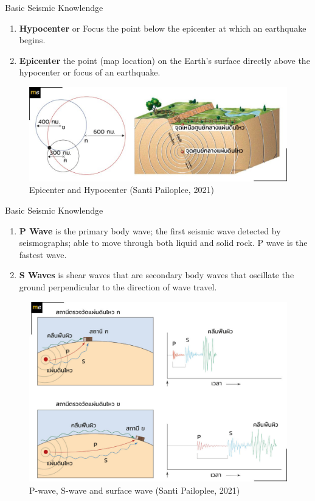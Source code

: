 \documentclass{beamer}
\newcounter{saveenumi}
\newcommand{\seti}{\setcounter{saveenumi}{\value{enumi}}}
\newcommand{\conti}{\setcounter{enumi}{\value{saveenumi}}}
\begin{document}
	\begin{frame}[t]{Basic Seismic Knowlendge}
		\begin{enumerate}
			\conti
			\item \textbf{Hypocenter} or Focus the point below the epicenter at which an earthquake
			begins.
			\item \textbf{Epicenter} the point (map location) on the Earth’s surface directly above 
			the hypocenter or focus of an earthquake.
			\seti
		\end{enumerate}
		\begin{figure}
			\centering
			\includegraphics[scale=0.8]{velocity.jpg}
			\caption{Epicenter and Hypocenter (Santi Pailoplee, 2021)}
		\end{figure}
	\end{frame}

	\begin{frame}[t]{Basic Seismic Knowlendge}
		\begin{enumerate}
			\conti
			\item \textbf{P Wave} is the primary body wave; the first seismic wave detected by 
			seismographs; able to move through both liquid and solid rock. P wave is the fastest wave.
			
			\item \textbf{S Waves} is shear waves that are secondary body waves that oscillate the ground perpendicular to the direction of wave travel. 
			\seti
		\end{enumerate}
		\begin{figure}
			\centering
			\includegraphics[scale=0.6]{station.jpg}
			\caption{P-wave, S-wave and surface wave (Santi Pailoplee, 2021)}
		\end{figure}
	\end{frame}
\end{document}

